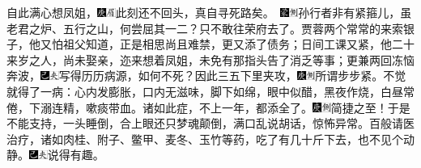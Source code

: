 自此满心想凤姐，{{\includegraphics[width=3mm]{../Images/00004}\includegraphics[width=3mm]{../Images/00010}\footnotesize \kaishu 此刻还不回头，真自寻死路矣。　}\includegraphics[width=3mm]{../Images/00006}\includegraphics[width=3mm]{../Images/00011}\footnotesize \kaishu 孙行者非有紧箍儿，虽老君之炉、五行之山，何尝屈其一二？}只不敢往荣府去了。贾蓉两个常常的来索银子，他又怕祖父知道，正是相思尚且难禁，更又添了债务；日间工课又紧，他二十来岁之人，尚未娶亲，迩来想着凤姐，未免有那指头告了消乏等事；更兼两回冻恼奔波，{\includegraphics[width=3mm]{../Images/00003}\includegraphics[width=3mm]{../Images/00012}\footnotesize \kaishu 写得历历病源，如何不死？}因此三五下里夹攻，{\includegraphics[width=3mm]{../Images/00004}\includegraphics[width=3mm]{../Images/00011}\footnotesize \kaishu 所谓步步紧。}不觉就得了一病：心内发膨胀，口内无滋味，脚下如绵，眼中似醋，黑夜作烧，白昼常倦，下溺连精，嗽痰带血。诸如此症，不上一年，都添全了。{\includegraphics[width=3mm]{../Images/00004}\includegraphics[width=3mm]{../Images/00011}\footnotesize \kaishu 简捷之至！}于是不能支持，一头睡倒，合上眼还只梦魂颠倒，满口乱说胡话，惊怖异常。百般请医治疗，诸如肉桂、附子、鳖甲、麦冬、玉竹等药，吃了有几十斤下去，也不见个动静。{\includegraphics[width=3mm]{../Images/00003}\includegraphics[width=3mm]{../Images/00012}\footnotesize \kaishu 说得有趣。}

